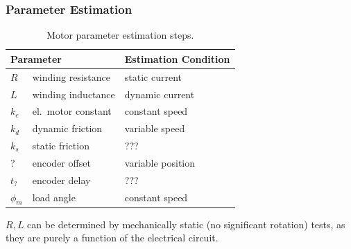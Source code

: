 \documentclass[12pt,a4paper,oneside,openany]{article}
\begin{document}

\subsubsection{Parameter Estimation}

\begin{table}[htbp]
\caption{Motor parameter estimation steps.}
\begin{center}
\begin{tabular}{llp{}} \toprule
 \multicolumn{2}{l}{Parameter} & Estimation Condition \\
\midrule
$R$ & winding resistance & static current\\
$L$ & winding inductance & dynamic current\\
$k_e$ & el.\ motor constant & constant speed\\
$k_d$ & dynamic friction & variable speed\\
$k_s$ & static friction & ???\\
? & encoder offset & variable position\\
$t_?$ & encoder delay & ???\\
$\phi_m$ & load angle & constant speed \\
\bottomrule
\end{tabular}
\end{center}
\label{tab:paramest}
\end{table}%


$R,L$ can be determined by mechanically static (no significant rotation) tests, as they are purely a function of the electrical circuit. 
\end{document}
